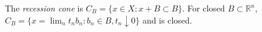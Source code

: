 The \emph{recession cone} is $C_B=\{x\in X:x+B\subset B\}$. For closed $B\subset\mathbb{R}^n$, $C_B=\{x=\lim_n t_n b_n:b_n\in B,t_n\downarrow0\}$ and is closed.
